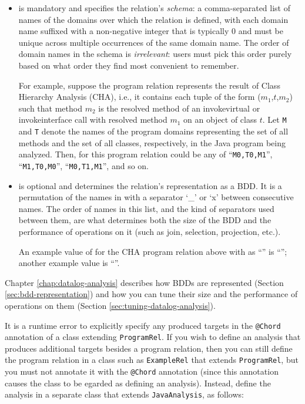 \begin{itemize}

\item

 is mandatory and specifies the relation's {\it schema}: a comma-separated list of names of
the domains over which the relation is defined, with each domain name suffixed with a
non-negative integer that is typically 0 and must be unique across multiple
occurrences of the same domain name.
The order of domain names in the schema is {\it irrelevant}: users must
pick this order purely based on what order they find most convenient to remember.

For example, suppose the program relation represents the result of Class Hierarchy
Analysis (CHA), i.e., it contains each tuple of the form ($m_1$,$t$,$m_2$) such that
method $m_2$ is the resolved method of an invokevirtual or invokeinterface call
with resolved method $m_1$ on an object of class $t$.  Let {\tt M} and {\tt T}
denote the names of the program domains representing the set of all methods
and the set of all classes, respectively, in the Java program being analyzed.
Then,  for this program relation could be any of ``{\tt M0,T0,M1}'',
``{\tt M1,T0,M0}'', ``{\tt M0,T1,M1}'', and so on.

\item

 is optional and determines the relation's representation as a
BDD. It is a permutation of the names in  with a separator
`\_' or `x' between consecutive names.  The order of names in this
list, and the kind of separators used between them, are what determines both
the size of the BDD and the performance of operations on it (such as join,
selection, projection, etc.).

An example value of  for the
CHA program relation above with  as ``''  is
``''; another example value is ``''.
\end{itemize}

Chapter \ref{chap:datalog-analysis} describes how BDDs are represented
(Section \ref{sec:bdd-representation}) and how you can tune their size and the
performance of operations on them (Section \ref{sec:tuning-datalog-analysis}).

It is a runtime error to explicitly specify any produced targets in the
{\tt @Chord} annotation of a class extending {\tt ProgramRel}.  If you wish to
define an analysis that produces additional targets besides a program relation,
then you can still define the program relation in a class such as
{\tt ExampleRel} that extends {\tt ProgramRel}, but you must not annotate it
with the {\tt @Chord} annotation (since this annotation causes the class to be 
egarded as defining an analysis).  Instead, define the analysis in a separate
class that extends {\tt JavaAnalysis}, as follows:

